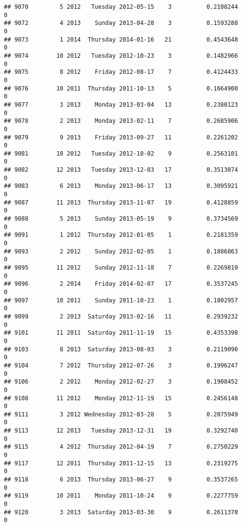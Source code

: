 \documentclass[
]{article}
\begin{document}
\begin{verbatim}
## 9070         5 2012   Tuesday 2012-05-15    3          0.2108244             0
## 9072         4 2013    Sunday 2013-04-28    3          0.1593288             0
## 9073         1 2014  Thursday 2014-01-16   21          0.4543648             0
## 9074        10 2012   Tuesday 2012-10-23    3          0.1482966             0
## 9075         8 2012    Friday 2012-08-17    7          0.4124433             0
## 9076        10 2011  Thursday 2011-10-13    5          0.1664900             0
## 9077         3 2013    Monday 2013-03-04   13          0.2380123             0
## 9078         2 2013    Monday 2013-02-11    7          0.2685906             0
## 9079         9 2013    Friday 2013-09-27   11          0.2261202             0
## 9081        10 2012   Tuesday 2012-10-02    9          0.2563101             0
## 9082        12 2013   Tuesday 2013-12-03   17          0.3513074             0
## 9083         6 2013    Monday 2013-06-17   13          0.3095921             0
## 9087        11 2013  Thursday 2013-11-07   19          0.4128859             0
## 9088         5 2013    Sunday 2013-05-19    9          0.3734569             0
## 9091         1 2012  Thursday 2012-01-05    1          0.2181359             0
## 9093         2 2012    Sunday 2012-02-05    1          0.1886863             0
## 9095        11 2012    Sunday 2012-11-18    7          0.2269819             0
## 9096         2 2014    Friday 2014-02-07   17          0.3537245             0
## 9097        10 2011    Sunday 2011-10-23    1          0.1802957             0
## 9099         2 2013  Saturday 2013-02-16   11          0.2939232             0
## 9101        11 2011  Saturday 2011-11-19   15          0.4353398             0
## 9103         8 2013  Saturday 2013-08-03    3          0.2119090             0
## 9104         7 2012  Thursday 2012-07-26    3          0.1996247             0
## 9106         2 2012    Monday 2012-02-27    3          0.1908452             0
## 9108        11 2012    Monday 2012-11-19   15          0.2456148             0
## 9111         3 2012 Wednesday 2012-03-28    5          0.2075949             0
## 9113        12 2013   Tuesday 2013-12-31   19          0.3292740             0
## 9115         4 2012  Thursday 2012-04-19    7          0.2750229             0
## 9117        12 2011  Thursday 2011-12-15   13          0.2319275             0
## 9118         6 2013  Thursday 2013-06-27    9          0.3537265             0
## 9119        10 2011    Monday 2011-10-24    9          0.2277759             0
## 9120         3 2013  Saturday 2013-03-30    9          0.2611370             0

\end{verbatim}
\end{document}
